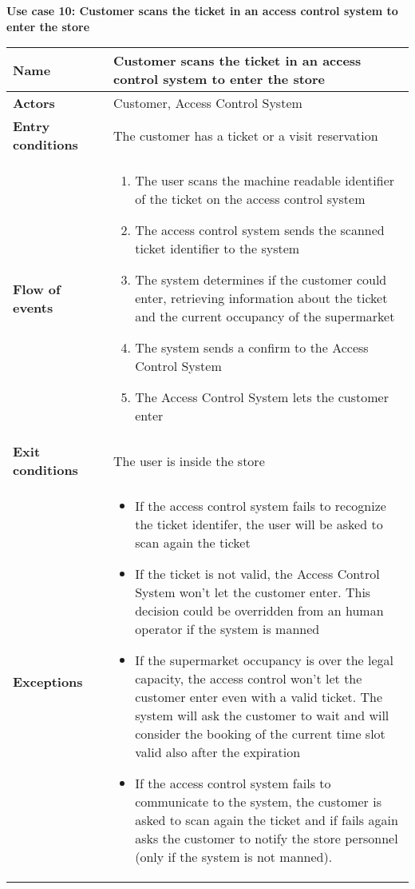     \clearpage
    \textbf{Use case 10: Customer scans the ticket in an access control system to enter the store}
    \smallskip
    \begin{longtable}{p{0.25\linewidth}p{0.75\linewidth}}
    \toprule
    \textbf{Name} & \textbf{Customer scans the ticket in an access control system to enter the store} \\
    \midrule
    \textbf{Actors} & Customer, Access Control System\\
    \midrule
    \textbf{Entry conditions} & The customer has a ticket or a visit reservation \\
    \midrule
    \textbf{Flow of events} & 
    \begin{enumerate}
        \item The user scans the machine readable identifier of the ticket on the access control system 
        \item The access control system sends the scanned ticket identifier to the system 
        \item The system determines if the customer could enter, retrieving information about the ticket and the current occupancy of the supermarket
        \item The system sends a confirm to the Access Control System 
        \item The Access Control System lets the customer enter
    \end{enumerate} \\
    \midrule
    \textbf{Exit conditions} & The user is inside the store\\
    \midrule
    \textbf{Exceptions} &
    \begin{itemize}
        \item If the access control system fails to recognize the ticket identifer, the user will be asked to scan again the ticket
        \item If the ticket is not valid, the Access Control System won't let the customer enter. This decision could be overridden from an human operator if the system is manned
        \item If the supermarket occupancy is over the legal capacity, the access control won't let the customer enter even with a valid ticket. The system will ask the customer to wait and will consider the booking of the current time slot valid also after the expiration
        \item If the access control system fails to communicate to the system, the customer is asked to scan again the ticket and if fails again asks the customer to notify the store personnel (only if the system is not manned).

\end{itemize}
\end{longtable}
